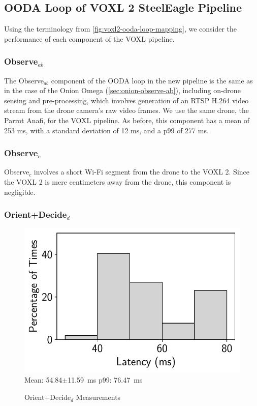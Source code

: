 \subsection{OODA Loop of VOXL 2 SteelEagle Pipeline}

Using the terminology from \cref{fig:voxl2-ooda-loop-mapping}, we consider the
performance of each component of the VOXL pipeline.

\subsubsection*{Observe$_{ab}$}

The Observe$_{ab}$ component of the OODA loop in the new pipeline is the same as in
the case of the Onion Omega (\cref{sec:onion-observe-ab}), including on-drone
sensing and pre-processing, which involves generation of an RTSP H.264 video
stream from the drone camera's raw video frames. We use the same drone,
the Parrot Anafi, for the VOXL pipeline. As before, this component has a mean
of 253 ms, with a standard deviation of 12 ms, and a p99 of 277 ms.

\subsubsection*{Observe$_{c}$}

Observe$_c$ involves a short Wi-Fi segment from the drone to the VOXL 2. Since
the VOXL 2 is mere centimeters away from the drone, this component is
negligible.

\subsubsection*{Orient+Decide$_{d}$}

\begin{figure}[htbp]
    \centering
    \includegraphics[width = .4\textwidth]{figs/voxl-decoding-time.pdf}\\
\small{Mean: 54.84$\pm$11.59~ms\; p99: 76.47~ms}\\
\caption{Orient+Decide$_d$ Measurements}
\label{fig:voxl2-decoding-latency}
\end{figure}

